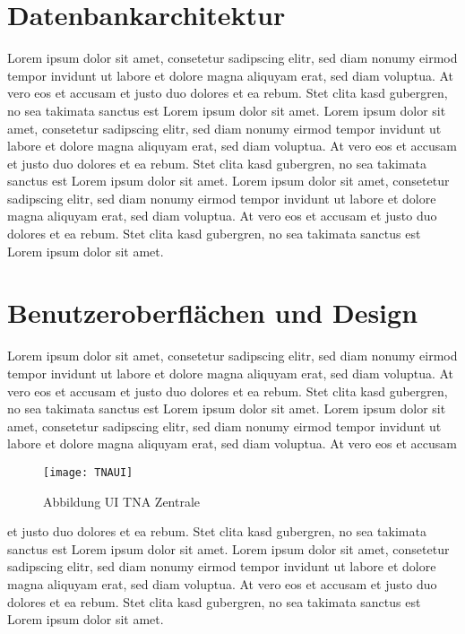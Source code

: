 \section{Datenbankarchitektur}
Lorem ipsum dolor sit amet, consetetur sadipscing elitr, sed diam nonumy eirmod tempor invidunt ut labore et dolore magna aliquyam erat, sed diam voluptua. At vero eos et accusam et justo duo dolores et ea rebum. Stet clita kasd gubergren, no sea takimata sanctus est Lorem ipsum dolor sit amet. Lorem ipsum dolor sit amet, consetetur sadipscing elitr, sed diam nonumy eirmod tempor invidunt ut labore et dolore magna aliquyam erat, sed diam voluptua. At vero eos et accusam et justo duo dolores et ea rebum. Stet clita kasd gubergren, no sea takimata sanctus est Lorem ipsum dolor sit amet. Lorem ipsum dolor sit amet, consetetur sadipscing elitr, sed diam nonumy eirmod tempor invidunt ut labore et dolore magna aliquyam erat, sed diam voluptua. At vero eos et accusam et justo duo dolores et ea rebum. Stet clita kasd gubergren, no sea takimata sanctus est Lorem ipsum dolor sit amet.

\section{Benutzeroberflächen und Design}
Lorem ipsum dolor sit amet, consetetur sadipscing elitr, sed diam nonumy eirmod tempor invidunt ut labore et dolore magna aliquyam erat, sed diam voluptua. 
At vero eos et accusam et justo duo dolores et ea rebum. Stet clita kasd gubergren, no sea takimata sanctus est Lorem ipsum dolor sit amet. Lorem ipsum dolor 
sit amet, consetetur sadipscing elitr, sed diam nonumy eirmod tempor invidunt ut labore et dolore magna aliquyam erat, sed diam voluptua. At vero eos et accusam 

\begin{figure}[H]
    \centering
    \texttt{[image: TNAUI]}
    \caption{Abbildung UI TNA Zentrale}
    \label{img:TNAUI}
\end{figure}

et justo duo dolores et ea rebum. Stet clita kasd gubergren, no sea takimata sanctus est Lorem ipsum dolor sit amet. Lorem ipsum dolor sit amet, consetetur sadipscing 
elitr, sed diam nonumy eirmod tempor invidunt ut labore et dolore magna aliquyam erat, sed diam voluptua. At vero eos et accusam et justo duo dolores et ea rebum. Stet 
clita kasd gubergren, no sea takimata sanctus est Lorem ipsum dolor sit amet.
